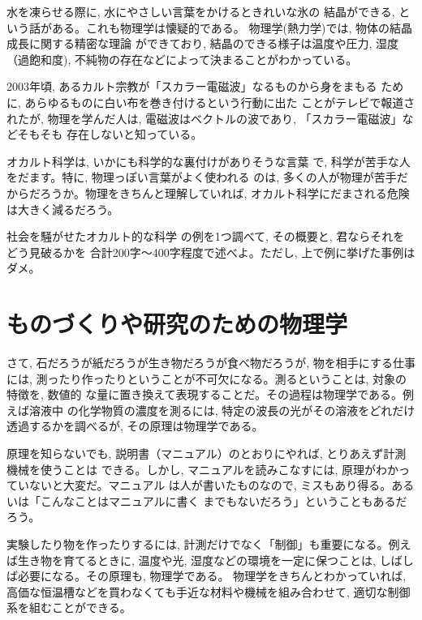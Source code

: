 \begin{exmpl}水を凍らせる際に, 水にやさしい言葉をかけるときれいな氷の
結晶ができる, という話がある。これも物理学は懐疑的である。
物理学(熱力学)では, 物体の結晶成長に関する精密な理論
ができており, 結晶のできる様子は温度や圧力, 湿度（過飽和度), 
不純物の存在などによって決まることがわかっている。\end{exmpl}

\begin{exmpl}2003年頃, あるカルト宗教が「スカラー電磁波」なるものから身をまもる
ために, あらゆるものに白い布を巻き付けるという行動に出た
ことがテレビで報道されたが, 物理を学んだ人は, 
電磁波はベクトルの波であり, 「スカラー電磁波」などそもそも
存在しないと知っている。\end{exmpl}\mv

オカルト科学は, いかにも科学的な裏付けがありそうな言葉
で, 科学が苦手な人をだます。特に, 物理っぽい言葉がよく使われる
のは, 多くの人が物理が苦手だからだろうか。物理をきちんと理解していれば, 
オカルト科学にだまされる危険は大きく減るだろう。\mv

\begin{q}\label{q:fake_science} 社会を騒がせたオカルト的な科学
の例を1つ調べて, その概要と, 君ならそれをどう見破るかを
合計200字〜400字程度で述べよ。ただし, 上で例に挙げた事例はダメ。\end{q}
\hv


\section{ものづくりや研究のための物理学}
さて, 石だろうが紙だろうが生き物だろうが食べ物だろうが, 物を相手にする仕事には, 
測ったり作ったりということが不可欠になる。測るということは, 対象の特徴を, 数値的
な量に置き換えて表現することだ。その過程は物理学である。例えば溶液中
の化学物質の濃度を測るには, 特定の波長の光がその溶液をどれだけ透過するかを調べるが, 
その原理は物理学である。

原理を知らないでも, 説明書（マニュアル）のとおりにやれば, とりあえず計測機械を使うことは
できる。しかし, マニュアルを読みこなすには, 原理がわかっていないと大変だ。マニュアル
は人が書いたものなので, ミスもあり得る。あるいは「こんなことはマニュアルに書く
までもないだろう」ということもあるだろう。

実験したり物を作ったりするには, 計測だけでなく「制御」も重要になる。例えば生き物を育てるときに, 
温度や光, 湿度などの環境を一定に保つことは, しばしば必要になる。その原理も, 物理学である。
物理学をきちんとわかっていれば, 高価な恒温槽などを買わなくても手近な材料や機械を組み合わせて, 
適切な制御系を組むことができる。

